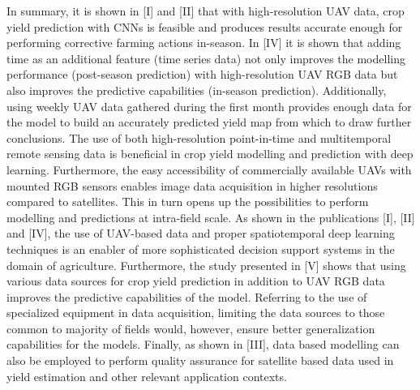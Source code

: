 In summary, it is shown in [I] and [II] that with high-resolution UAV data, crop yield prediction with CNNs is feasible and produces results accurate enough for performing corrective farming actions in-season. In [IV] it is shown that adding time as an additional feature (time series data) not only improves the modelling performance (post-season prediction) with high-resolution UAV RGB data but also improves the predictive capabilities (in-season prediction). Additionally, using weekly UAV data gathered during the first month provides enough data for the model to build an accurately predicted yield map from which to draw further conclusions. The use of both high-resolution point-in-time and multitemporal remote sensing data is beneficial in crop yield modelling and prediction with deep learning. Furthermore, the easy accessibility of commercially available UAVs with mounted RGB sensors enables image data acquisition in higher resolutions compared to satellites. This in turn opens up the possibilities to perform modelling and predictions at intra-field scale. As shown in the publications [I], [II] and [IV], the use of UAV-based data and proper spatiotemporal deep learning techniques is an enabler of more sophisticated decision support systems in the domain of agriculture. Furthermore, the study presented in [V] shows that using various data sources for crop yield prediction in addition to UAV RGB data improves the predictive capabilities of the model. Referring to the use of specialized equipment in data acquisition, limiting the data sources to those common to majority of fields would, however, ensure better generalization capabilities for the models. Finally, as shown in [III], data based modelling can also be employed to perform quality assurance for satellite based data used in yield estimation and other relevant application contexts. 